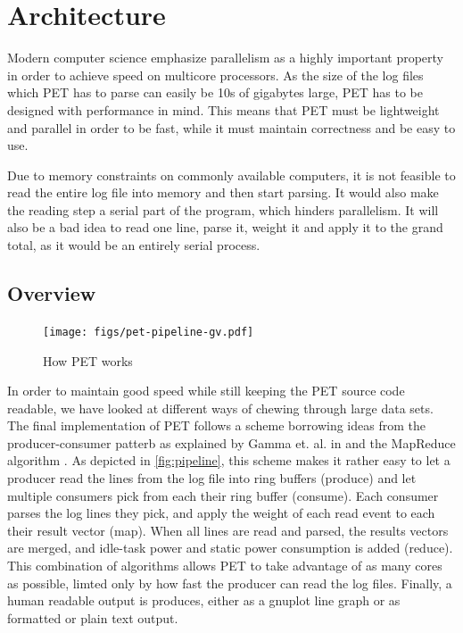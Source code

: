 \section{Architecture}

Modern computer science emphasize parallelism as a highly important property in
order to achieve speed on multicore processors. As the size of the log files
which PET has to parse can easily be 10s of gigabytes large, PET has to be
designed with performance in mind. This means that PET must be lightweight and
parallel in order to be fast, while it must maintain correctness and be easy to
use.

Due to memory constraints on commonly available computers, it is not feasible to
read the entire log file into memory and then start parsing. It would also make
the reading step a serial part of the program, which hinders parallelism. It
will also be a bad idea to read one line, parse it, weight it and apply it to
the grand total, as it would be an entirely serial process.

\subsection{Overview}

\begin{figure}[ht]
    \texttt{[image: figs/pet-pipeline-gv.pdf]}
    \caption{How PET works}
    \label{fig:pipeline}
\end{figure}

In order to maintain good speed while still keeping the PET source code
readable, we have looked at different ways of chewing through large data sets.
The final implementation of PET follows a scheme borrowing ideas from the
producer-consumer patterb as explained by Gamma et. al. in \cite{designpatterns}
and the MapReduce algorithm \cite{dean2008mapreduce}. As depicted in
\autoref{fig:pipeline}, this scheme makes it rather easy to let a producer read
the lines from the log file into ring buffers (produce) and let multiple
consumers pick from each their ring buffer (consume). Each consumer parses the log
lines they pick, and apply the weight of each read event to each their result
vector (map). When all lines are read and parsed, the results vectors are
merged, and idle-task power and static power consumption is added (reduce). This
combination of algorithms allows PET to take advantage of as many cores as
possible, limted only by how fast the producer can read the log files. Finally,
a human readable output is produces, either as a gnuplot line graph or as
formatted or plain text output.


